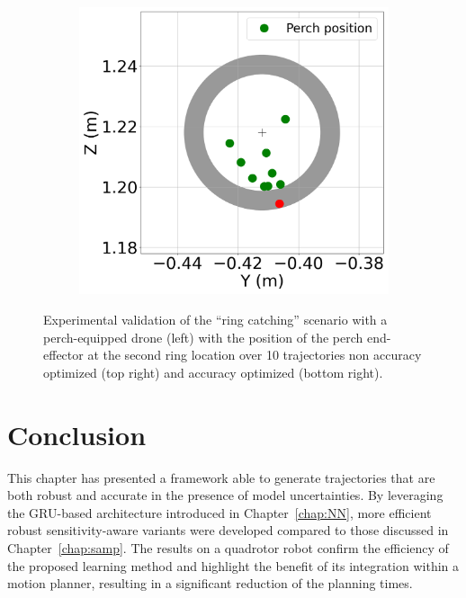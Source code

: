 \begin{figure} [h!]
\begin{subfigure}{0.37\linewidth}
        \includegraphics[width=\linewidth]{figures/robust_accurate/Exp_ring_opti_full_zoom.png}
    \end{subfigure}\hfill
    
\caption{Experimental validation of the ``ring catching'' scenario with a perch-equipped drone (left) with the position of the perch end-effector at the second ring location over 10 trajectories non accuracy optimized (top right) and accuracy optimized (bottom right).}
\label{fig: exp ring}
\end{figure}

\section{Conclusion} \label{sec:Conclusion}

This chapter has presented a framework able to generate trajectories that are both robust and accurate in the presence of model uncertainties.
By leveraging the GRU-based architecture introduced in Chapter~\ref{chap:NN}, more efficient robust sensitivity-aware variants were developed compared to those discussed in Chapter~\ref{chap:samp}.
The results on a quadrotor robot confirm the efficiency of the proposed learning method and highlight the benefit of its integration within a motion planner, resulting in a significant reduction of the planning times. 

